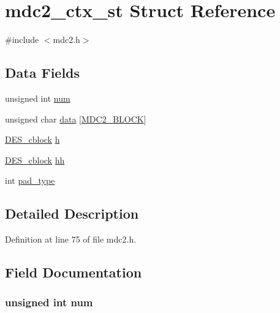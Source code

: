 \hypertarget{structmdc2__ctx__st}{}\section{mdc2\+\_\+ctx\+\_\+st Struct Reference}
\label{structmdc2__ctx__st}


{\ttfamily \#include $<$mdc2.\+h$>$}

\subsection*{Data Fields}
\begin{DoxyCompactItemize}
\item 
unsigned int \hyperlink{structmdc2__ctx__st_a41ddefd3473727cad32a9767c10faed8}{num}
\item 
unsigned char \hyperlink{structmdc2__ctx__st_a334dbe9894d1087fc0023a9eb98cf2d5}{data} \mbox{[}\hyperlink{mdc2_8h_a3de1874e1a6ec169df18c08da2a642de}{M\+D\+C2\+\_\+\+B\+L\+O\+CK}\mbox{]}
\item 
\hyperlink{include_2openssl_2des_8h_adcbbb795f912b83b7aa8c2660eb1bee4}{D\+E\+S\+\_\+cblock} \hyperlink{structmdc2__ctx__st_ae2d0d122d288236d586f65bc6ecd2a38}{h}
\item 
\hyperlink{include_2openssl_2des_8h_adcbbb795f912b83b7aa8c2660eb1bee4}{D\+E\+S\+\_\+cblock} \hyperlink{structmdc2__ctx__st_a1f580bbafa4c401e869c1261c5ccb1e2}{hh}
\item 
int \hyperlink{structmdc2__ctx__st_a328df4848687bac798ba6b29d91fec92}{pad\+\_\+type}
\end{DoxyCompactItemize}


\subsection{Detailed Description}


Definition at line 75 of file mdc2.\+h.



\subsection{Field Documentation}
\subsubsection[{\texorpdfstring{num}{num}}]{\setlength{\rightskip}{0pt plus 5cm}unsigned int num}\hypertarget{structmdc2__ctx__st_a41ddefd3473727cad32a9767c10faed8}{}\label{structmdc2__ctx__st_a41ddefd3473727cad32a9767c10faed8}


